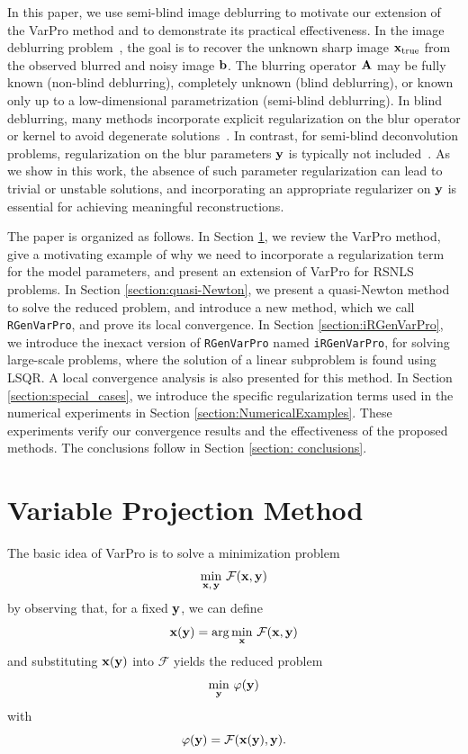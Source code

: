 \documentclass[onefignum,onetabnum]{siamart171218}
\newcommand{\bA}{{\bf A}}
\newcommand{\bb}{{\bf b}}
\newcommand{\bx}{{\bf x}}
\newcommand{\by}{{\bf y}}
\newcommand{\calF}{\mathcal{F}}
\begin{document}
In this paper, we use semi-blind image deblurring to motivate our extension of the VarPro method and to demonstrate its practical effectiveness. In the image deblurring problem~\cite{austin2022image, espanol2009multilevel, deblurring}, the goal is to recover the unknown sharp image $\bx_{\rm true}$ from the observed blurred and noisy image $\bb$. The blurring operator $\bA$ may be fully known (non-blind deblurring), completely unknown (blind deblurring), or known only up to a low-dimensional parametrization (semi-blind deblurring). In blind deblurring, many methods incorporate explicit regularization on the blur operator or kernel to avoid degenerate solutions~\cite{chan1998total, dykes2021lanczos, levin2009understanding}. In contrast, for semi-blind deconvolution problems, regularization on the blur parameters $\by$ is typically not included~\cite{buccini2018semiblind, chung2010efficient, cornelio2014constrained, espanol2025local, Espanol_2023, gazzola2021regularization}. As we show in this work, the absence of such parameter regularization can lead to trivial or unstable solutions, and incorporating an appropriate regularizer on $\by$ is essential for achieving meaningful reconstructions.

The paper is organized as follows. In Section \ref{sec:varpro}, we review the VarPro method, give a motivating example of why we need to incorporate a regularization term for the model parameters, and present an extension of VarPro for RSNLS problems. In Section \ref{section:quasi-Newton}, we present a quasi-Newton method to solve the reduced problem, and introduce a new method, which we call \texttt{RGenVarPro}, and prove its local convergence. In Section \ref{section:iRGenVarPro}, we introduce the inexact version of \texttt{RGenVarPro} named \texttt{iRGenVarPro}, for solving large-scale problems, where the solution of a linear subproblem is found using LSQR. A local convergence analysis is also presented for this method. In Section \ref{section:special_cases}, we introduce the specific regularization terms used in the numerical experiments in Section \ref{section:NumericalExamples}. These experiments verify our convergence results and the effectiveness of the proposed methods. The conclusions follow in %
Section \ref{section: conclusions}.

\section{Variable Projection Method}\label{sec:varpro}
The %
basic idea of VarPro is to solve a minimization problem  
$$\min_{\bx,\,\by}\,\calF(\bx,\by)$$
by observing that, for a fixed \(\by\), we can define
$$\bx(\by) = \arg\min_{\bx}\,\calF(\bx, \by)$$
and substituting $\bx(\by)$ into $\calF$ yields the reduced problem  
\begin{equation}\label{eq: minvarphi}
\min_{\by}\,\varphi(\by)
\end{equation}
 with $$\varphi(\by) = \calF(\bx(\by), \by).$$
 
\end{document}
